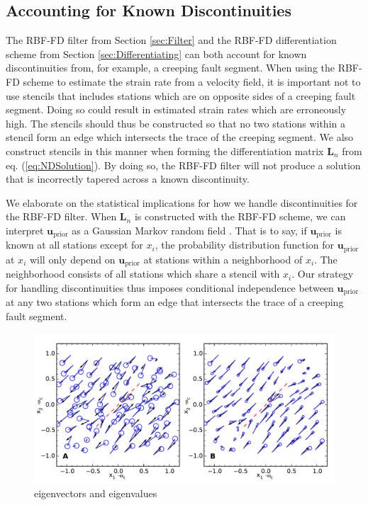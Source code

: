 \documentclass[10pt,a4paper]{article}
\begin{document}
\subsection{Accounting for Known Discontinuities}\label{sec:Discontinuities}
The RBF-FD filter from Section \ref{sec:Filter} and the RBF-FD differentiation scheme from Section \ref{sec:Differentiating} can both account for known discontinuities from, for example, a creeping fault segment.  When using the RBF-FD scheme to estimate the strain rate from a velocity field, it is important not to use stencils that includes stations which are on opposite sides of a creeping fault segment. Doing so could result in estimated strain rates which are erroneously high. The stencils should thus be constructed so that no two stations within a stencil form an edge which intersects the trace of the creeping segment.  We also construct stencils in this manner when forming the differentiation matrix $\mathbf{L}_n$ from eq. (\ref{eq:NDSolution}).  By doing so, the RBF-FD filter will not produce a solution that is incorrectly tapered across a known discontinuity.

We elaborate on the statistical implications for how we handle discontinuities for the RBF-FD filter.  When $\mathbf{L}_n$ is constructed with the RBF-FD scheme, we can interpret $\mathbf{u}_\mathrm{prior}$ as a Gaussian Markov random field \citep[e.g.][]{Rue2005}.  That is to say, if $\mathbf{u}_\mathrm{prior}$ is known at all stations except for $x_i$, the probability distribution function for $\mathbf{u}_\mathrm{prior}$ at $x_i$ will only depend on $\mathbf{u}_\mathrm{prior}$ at stations within a neighborhood of $x_i$.  The neighborhood consists of all stations which share a stencil with $x_i$. Our strategy for handling discontinuities thus imposes conditional independence between $\mathbf{u}_\mathrm{prior}$ at any two stations which form an edge that intersects the trace of a creeping fault segment. 

\begin{figure}
\includegraphics[scale=1.0]{figures/figure4}
\caption{eigenvectors and eigenvalues}   
\label{fig:Demo3}
\end{figure}
\end{document}
